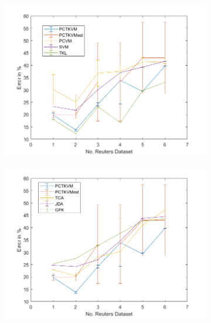 \begin{figure}[!]
	\centering
	\begin{subfigure}{.5\textwidth}
		\centering
		\includegraphics[width=1\linewidth]{figures/AverageReuters.png}
		\caption{\label{FigErrorAvReuTL}}
	\end{subfigure}%
	\begin{subfigure}{.5\textwidth}
		\centering
		\includegraphics[width=1\linewidth]{figures/AverageReutersTL.png}
		\caption{\label{FigErrorAvReuO}}
	\end{subfigure}
	\begin{subfigure}{.5\textwidth}
		\centering

\end{subfigure}
\end{figure}
